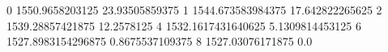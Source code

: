 0 1550.9658203125 23.93505859375
1 1544.673583984375 17.642822265625
2 1539.28857421875 12.2578125
4 1532.1617431640625 5.1309814453125
6 1527.8983154296875 0.8675537109375
8 1527.03076171875 0.0
